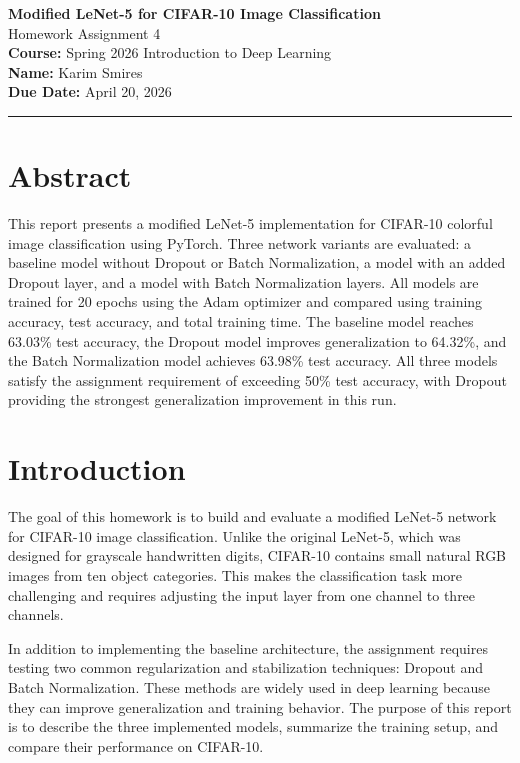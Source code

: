 \documentclass[11pt]{article}
\begin{document}
\begin{center}
  {\Large \textbf{Modified LeNet-5 for CIFAR-10 Image Classification}} \\
  \vspace{0.2cm}
  {\large Homework Assignment 4} \\
  \vspace{0.2cm}
  \textbf{Course:} Spring 2026 Introduction to Deep Learning \\
  \textbf{Name:} Karim Smires \\
  \textbf{Due Date:} April 20, 2026
\end{center}
\hrule
\vspace{0.5cm}

\section*{Abstract}
This report presents a modified LeNet-5 implementation for CIFAR-10 colorful image
classification using PyTorch. Three network variants are evaluated: a baseline model
without Dropout or Batch Normalization, a model with an added Dropout layer, and a
model with Batch Normalization layers. All models are trained for 20 epochs using the
Adam optimizer and compared using training accuracy, test accuracy, and total training
time. The baseline model reaches 63.03\% test accuracy, the Dropout model improves
generalization to 64.32\%, and the Batch Normalization model achieves 63.98\% test
accuracy. All three models satisfy the assignment requirement of exceeding 50\% test
accuracy, with Dropout providing the strongest generalization improvement in this run.

\section{Introduction}
The goal of this homework is to build and evaluate a modified LeNet-5 network for
CIFAR-10 image classification. Unlike the original LeNet-5, which was designed for
grayscale handwritten digits, CIFAR-10 contains small natural RGB images from ten
object categories. This makes the classification task more challenging and requires
adjusting the input layer from one channel to three channels.

In addition to implementing the baseline architecture, the assignment requires testing
two common regularization and stabilization techniques: Dropout and Batch
Normalization. These methods are widely used in deep learning because they can improve
generalization and training behavior. The purpose of this report is to describe the
three implemented models, summarize the training setup, and compare their performance
on CIFAR-10.
\end{document}
